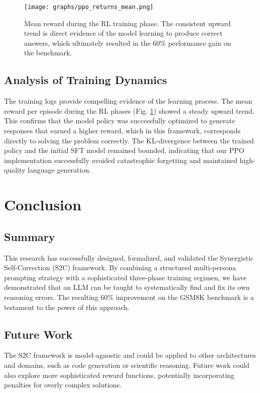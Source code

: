 \documentclass[conference]{IEEEtran}
\begin{document}
\begin{figure}[htbp]
\centerline{\texttt{[image: graphs/ppo\_returns\_mean.png]}}
\caption{Mean reward during the RL training phase. The consistent upward trend is direct evidence of the model learning to produce correct answers, which ultimately resulted in the 60\% performance gain on the benchmark.}
\label{fig}
\end{figure}

\subsection{Analysis of Training Dynamics}
The training logs provide compelling evidence of the learning process. The mean reward per episode during the RL phases (Fig. \ref{fig}) showed a steady upward trend. This confirms that the model policy was successfully optimized to generate responses that earned a higher reward, which in this framework, corresponds directly to solving the problem correctly. The KL-divergence between the trained policy and the initial SFT model remained bounded, indicating that our PPO implementation successfully avoided catastrophic forgetting and maintained high-quality language generation.

\section{Conclusion}
\subsection{Summary}
This research has successfully designed, formalized, and validated the Synergistic Self-Correction (S2C) framework. By combining a structured multi-persona prompting strategy with a sophisticated three-phase training regimen, we have demonstrated that an LLM can be taught to systematically find and fix its own reasoning errors. The resulting 60\% improvement on the GSM8K benchmark is a testament to the power of this approach.

\subsection{Future Work}
The S2C framework is model-agnostic and could be applied to other architectures and domains, such as code generation or scientific reasoning. Future work could also explore more sophisticated reward functions, potentially incorporating penalties for overly complex solutions.
\end{document}
